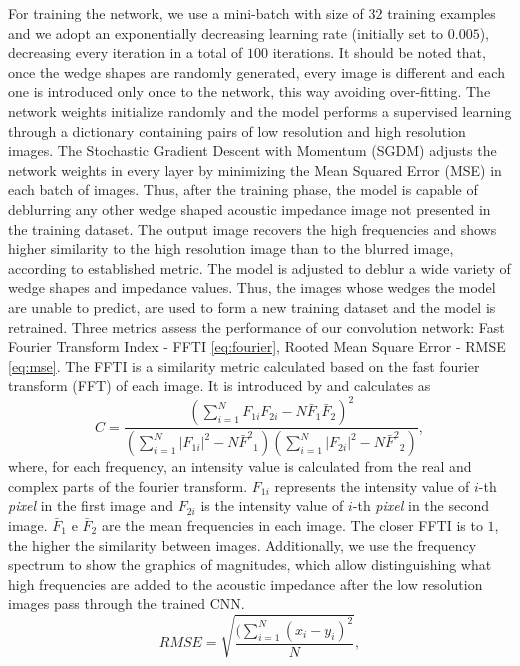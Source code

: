 \documentclass[conference]{IEEEtran}
\begin{document}
For training the network, we use a mini-batch with size of $32$ training examples
and we adopt an exponentially decreasing learning rate (initially
set to $0.005$), decreasing every iteration in a total of $100$ iterations.
It should be noted that, once the wedge shapes are randomly generated, every image is different
and each one is introduced only once to the network, this way avoiding over-fitting.
The network weights initialize randomly and the model performs a supervised learning through a dictionary containing pairs of low resolution and high resolution images.
The Stochastic Gradient Descent with Momentum (SGDM) \cite{Ning1999} adjusts the network weights in every layer by minimizing the Mean Squared Error (MSE)
in each batch of images. Thus, after the training phase, the model is capable of
deblurring any other wedge shaped acoustic impedance image not presented in the training dataset. The output
image recovers the high frequencies and shows higher similarity
to the high resolution image than to the blurred image, according to established metric.
The model is adjusted to deblur a wide variety of wedge shapes and impedance values.
Thus, the images whose wedges the model are unable to predict, are used to form a new training dataset
and the model is retrained.
Three metrics assess the performance of our convolution network: Fast Fourier Transform Index - FFTI \eqref{eq:fourier},
Rooted Mean Square Error - RMSE \eqref{eq:mse}. 
The FFTI is a similarity metric calculated based on the fast fourier transform (FFT) of each image.
It is introduced by \cite{Naranyana2015} and calculates as 
\begin{equation}
 C = \frac{ (\sum_{i=1}^{N}{F_{1i}F_{2i}} - N \bar{F}_1\bar{F}_2 )^2 }{ (\sum_{i=1}^{N}{|F_{1i}|^2} - N{\bar{F}^2}_1)( \sum_{i=1}^{N}{|F_{2i}|^2} - N{\bar{F}^2}_2 )},
 \label{eq:fourier}
\end{equation}
where, for each frequency, an intensity value is calculated from the real and complex parts of the fourier
transform. $F_{1i}$ represents the intensity value of $i$-th \textit{pixel} in the first image and $F_{2i}$
is the intensity value of $i$-th \textit{pixel} in the second image. $\bar{F}_1$ e $\bar{F}_2$ are the mean
frequencies in each image. The closer FFTI is to $1$, the higher the similarity between images.
Additionally, we use the frequency spectrum to show the graphics of magnitudes, which allow distinguishing what high frequencies are added to the acoustic impedance after the low resolution images pass through the trained CNN. 
\begin{equation}
 RMSE = \sqrt{\frac{ (\sum_{i=1}^{N}{(x_i -y_i)^2 } }{N}},
 \label{eq:mse}
\end{equation}
\end{document}
